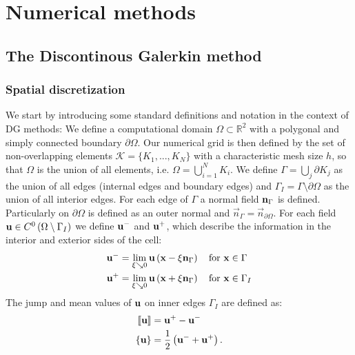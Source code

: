 \chapter{Numerical methods}	\label{ch:introduction}

\section{The Discontinous Galerkin method}
\subsection{Spatial discretization} \label{ssec:SpatDiscretization}
We start by introducing some standard definitions and notation in the context of DG methods:\cite{kummerExtendedDiscontinuousGalerkin2017} \cite{kikkerFullyCoupledHighorder}
We define a computational domain $\Omega \subset \mathbb{R}^2$ with a polygonal and simply connected boundary $\partial \Omega$. Our numerical grid is then defined by the set of non-overlapping elements $\mathcal{K} = \{K_1, ..., K_N\}$ with a characteristic mesh size $h$, so that $\Omega$ is the union of all elements, i.e. $\Omega = \bigcup_{i=1}^N K_i$. We define  $\Gamma = \bigcup_j \partial K_j$ as the union of all edges (internal edges and boundary edges) and $\Gamma_I = \Gamma \setminus \partial \Omega$ as the union of all interior edges.
For each edge of $\Gamma$ a normal field $\textbf{n}_{\Gamma}$ is defined. Particularly on $\partial \Omega$ is defined as an outer normal and $\vec{n}_\Gamma = \vec{n}_{\partial\Omega}$.
For each field $\textbf{u} \in C^0\left(\Omega\setminus \Gamma_I\right)$ we define  $\textbf{u}^-$  and  $\textbf{u}^+$, which describe the information in the interior and exterior sides of the cell:
\begin{align}
	\textbf{u}^- & = \lim_{\xi \searrow 0} \textbf{u}\left(\textbf{x} - \xi \textbf{n}_{\Gamma}\right) \quad \text{for } \textbf{x}\in \Gamma   \\
	\textbf{u}^+ & = \lim_{\xi \searrow 0} \textbf{u}\left(\textbf{x} + \xi \textbf{n}_{\Gamma}\right) \quad \text{for } \textbf{x}\in \Gamma_I
\end{align}
The jump and mean values of $\textbf{u}$ on inner edges $\Gamma_I$ are defined as:
\begin{align}
	\llbracket \textbf{u} \rrbracket & = \textbf{u}^+-\textbf{u}^-                           \\
	\{\textbf{u}\}                   & = \frac{1}{2} \left(\textbf{u}^-+\textbf{u}^+\right).
\end{align}
